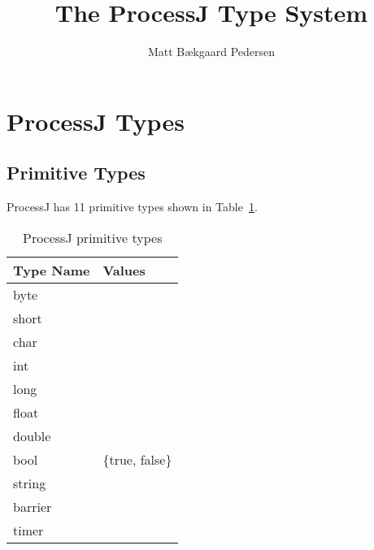 \documentclass[]{article}
\author{Matt B\ae{}kgaard Pedersen}
\title{The ProcessJ Type System}
\begin{document}
\maketitle

\begin{abstract}

\end{abstract}

\section{ProcessJ Types}

\subsection{Primitive Types}
ProcessJ has 11 primitive types shown in Table~\ref{tab:primitiveTypes}.
\begin{table}[!h]
  \begin{center}
    \caption{ProcessJ primitive types}
    \label{tab:primitiveTypes} 
    \begin{tabular}{|l|l|}\hline
      Type Name & Values \\ \hline\hline
      byte & \\
      short & \\
      char & \\
      int & \\
      long & \\
      float & \\
      double & \\
      bool & \{true, false\}\\
      string & \\
      barrier & \\
      timer & \\ \hline
    \end{tabular}
  \end{center}
\end{table}
\end{document}
